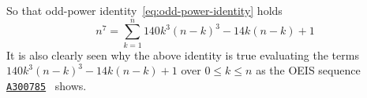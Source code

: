 So that odd-power identity~\eqref{eq:odd-power-identity} holds
\begin{equation*}
    n^7 = \sum_{k=1}^{n} 140 k^3 (n-k)^3 - 14k(n-k) + 1
\end{equation*}
It is also clearly seen
why the above identity is true evaluating the terms $140 k^3 (n-k)^3 - 14k(n-k) + 1$ over $0 \leq k \leq n$ as
the OEIS sequence \href{https://oeis.org/A300785}{\texttt{A300785}}~\cite{kolosov2018seventh} shows.

